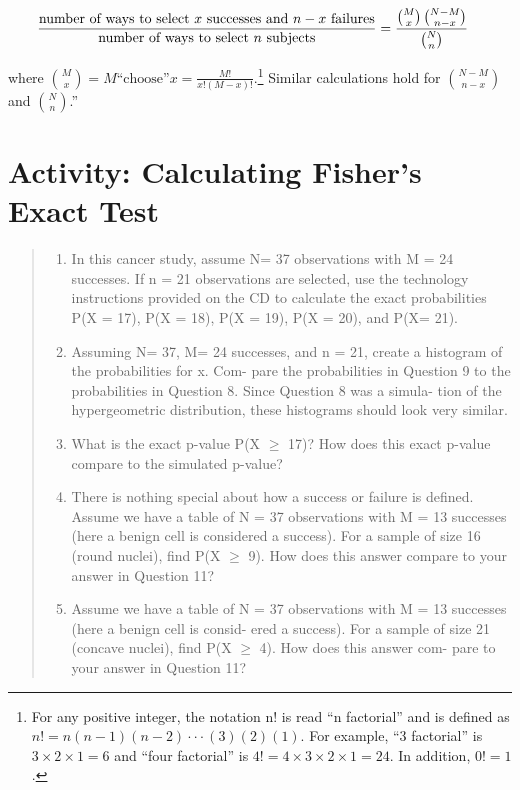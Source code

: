 \documentclass[
]{report}
\providecommand{\tightlist}{%
  \setlength{\itemsep}{0pt}\setlength{\parskip}{0pt}}
\begin{document}
\begin{align}
\frac{\text{number of ways to select $x$ successes and $n - x$ failures}}{\text{number of ways to select $n$ subjects}}
 &= \frac{\binom{M}{x}\,\binom{N - M}{n - x}}{\binom{N}{n}} \notag
\end{align}

where \(\binom{M}{x} = M \text{“choose”} x = \frac{M!}{x!(M - x)!}\).\footnote{For any positive integer, the notation n! is read ``n factorial'' and is defined as \(n!= n(n- 1)(n- 2) \cdot\cdot\cdot (3)(2)(1)\). For example, ``3 factorial'' is \(3 \times 2 \times 1= 6\) and ``four factorial'' is \(4!= 4 \times 3 \times 2 \times 1= 24\). In addition, \(0!= 1\).} Similar calculations hold for \(\binom{N - M}{n - x}\) and \(\binom{N}{n}\).''

\section*{Activity: Calculating Fisher's Exact Test}\label{activity-calculating-fishers-exact-test}

\begin{quote}
\begin{enumerate}
\def\labelenumi{\arabic{enumi}.}
\setcounter{enumi}{8}
\tightlist
\item
  In this cancer study, assume N= 37 observations with M = 24 successes. If n = 21 observations
  are selected, use the technology instructions provided on the CD to calculate the exact probabilities
  P(X = 17), P(X = 18), P(X = 19), P(X = 20), and P(X= 21).
\item
  Assuming N= 37, M= 24 successes, and n = 21, create a histogram of the probabilities for x. Com-
  pare the probabilities in Question 9 to the probabilities in Question 8. Since Question 8 was a simula-
  tion of the hypergeometric distribution, these histograms should look very similar.
\item
  What is the exact p-value P(X \(\geq\) 17)? How does this exact p-value compare to the simulated
  p-value?
\item
  There is nothing special about how a success or failure is defined. Assume we have a table of
  N = 37 observations with M = 13 successes (here a benign cell is considered a success). For a
  sample of size 16 (round nuclei), find P(X \(\geq\) 9). How does this answer compare to your answer in
  Question 11?
\item
  Assume we have a table of N = 37 observations with M = 13 successes (here a benign cell is consid-
  ered a success). For a sample of size 21 (concave nuclei), find P(X \(\geq\) 4). How does this answer com-
  pare to your answer in Question 11?
\end{enumerate}
\end{quote}
\end{document}
